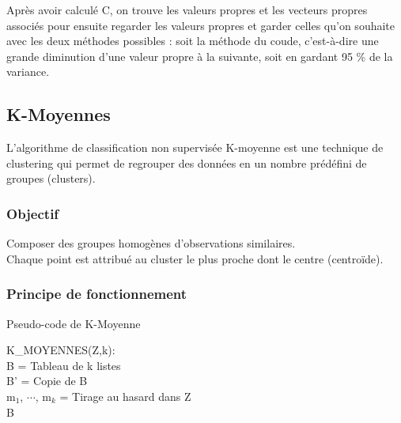 \documentclass[a4paper,12pt]{article}
\begin{document}
Après avoir calculé C, on trouve les valeurs propres et les vecteurs propres associés pour ensuite regarder les valeurs propres et garder celles qu'on souhaite avec les deux méthodes possibles : soit la méthode du coude, c'est-à-dire une grande diminution d'une valeur propre à la suivante, soit en gardant 95 \% de la variance.


\subsection{K-Moyennes}
L'algorithme de classification non supervisée K-moyenne est une technique de clustering qui permet de regrouper des données en un nombre prédéfini de groupes (clusters).

\subsubsection{Objectif}
Composer des groupes homogènes d'observations similaires.\\

Chaque point est attribué au cluster le plus proche dont le centre (centroïde).

\subsubsection{Principe de fonctionnement}

\begin{algorithm}[h!]
  \small
  \caption{Pseudo-code de K-Moyenne}
  K\_MOYENNES(Z,k):\\
  B = Tableau de k listes  \\
  B' = Copie de B\\
  m$_1$, $\cdots$, m$_k$ = Tirage au hasard dans Z\\
  \Return B
\end{algorithm}
\end{document}
